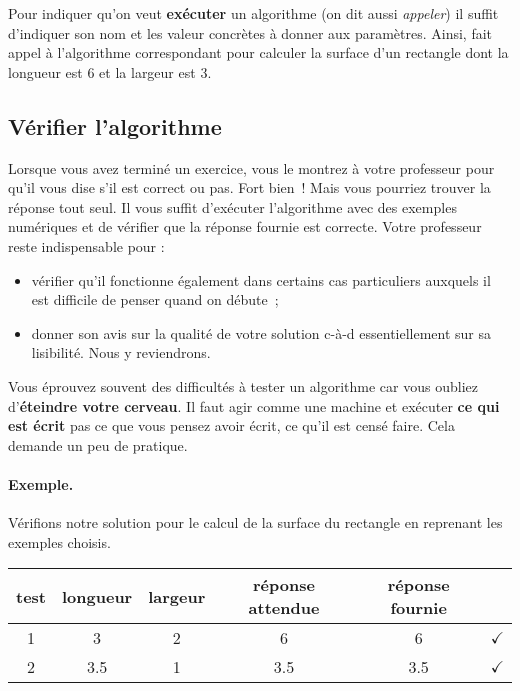 			Pour indiquer qu’on veut \textbf{exécuter} un algorithme
			(on dit aussi \emph{appeler})
			il suffit d’indiquer son nom 
			et les valeur concrètes à donner aux paramètres.
			Ainsi, 
			fait appel à l’algorithme correspondant
			pour calculer la surface d’un rectangle
			dont la longueur est $6$
			et la largeur est $3$.

		\subsection{Vérifier l’algorithme}
		
			Lorsque vous avez terminé un exercice,
			vous le montrez à votre professeur pour qu’il
			vous dise s’il est correct ou pas.
			Fort bien~!
			Mais vous pourriez trouver la réponse tout seul.
			Il vous suffit d’exécuter l’algorithme
			avec des exemples numériques et de vérifier que la réponse
			fournie est correcte.
			Votre professeur reste indispensable pour :
			\begin{itemize}
			\item
				vérifier qu’il fonctionne également
				dans certains cas particuliers
				auxquels il est difficile de penser quand on débute~;
			\item
				donner son avis sur la qualité de votre solution
				c-à-d essentiellement sur sa lisibilité.
				Nous y reviendrons.
			\end{itemize}
		
			Vous éprouvez souvent des difficultés à tester un algorithme
			car vous oubliez d’\textbf{éteindre votre cerveau}.
			Il faut agir comme une machine
			et exécuter \textbf{ce qui est écrit} 
			pas ce que vous pensez avoir écrit,
			ce qu’il est censé faire.
			Cela demande un peu de pratique.

			\paragraph{Exemple.} 
			Vérifions notre solution 
			pour le calcul de la surface du rectangle
			en reprenant les exemples choisis.
			
			\begin{center}
			\begin{tabular}{|c|cccc|c|}
			\hline
			test \no & longueur & largeur & réponse attendue & réponse fournie & {} \\\hline
			\hline 
			1 & 3   & 2 & 6   & 6   & {\color{ForestGreen}$\checkmark$} \\\hline
			2 & 3.5 & 1 & 3.5 & 3.5 & {\color{ForestGreen}$\checkmark$} \\\hline
			\end{tabular}
			\end{center}				
			
